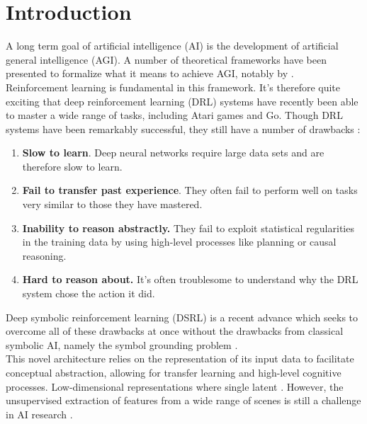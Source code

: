 \documentclass[12pt,twoside]{article}
\begin{document}


\tableofcontents
\newpage

 

\section{Introduction}
A long term goal of artificial intelligence (AI) is the development of artificial general intelligence (AGI). A number of theoretical frameworks have been presented to formalize what it means to achieve AGI, notably by \cite{Hutter2005}.\\

Reinforcement learning is fundamental in this framework. It's therefore quite exciting that deep reinforcement learning (DRL) systems have recently been able to master a wide range of tasks, including Atari games and Go. Though DRL systems have been remarkably successful, they still have a number of drawbacks \cite{Garnelo2016} \cite{Chollet2015}:

\begin{enumerate}
\item \textbf{Slow to learn}. Deep neural networks require large data sets and are therefore slow to learn.
\item \textbf{Fail to transfer past experience}. They often fail to perform well on tasks very similar to those they have mastered.
\item \textbf{Inability to reason abstractly.} They fail to exploit statistical regularities in the training data by using high-level processes like planning or causal reasoning.
\item \textbf{Hard to reason about.} It's often troublesome to understand why the DRL system chose the action it did.
\end{enumerate}

Deep symbolic reinforcement learning (DSRL) is a recent advance which seeks to overcome all of these drawbacks at once without the drawbacks from classical symbolic AI, namely the symbol grounding problem \cite{Garnelo2016}.\\

This novel architecture relies on the representation of its input data to facilitate conceptual abstraction, allowing for transfer learning and high-level cognitive processes. Low-dimensional representations where single latent \cite{Garnelo2016}. However, the unsupervised extraction of features from a wide range of scenes is still a challenge in AI research \cite{Bengio2013}.\\
\end{document}

